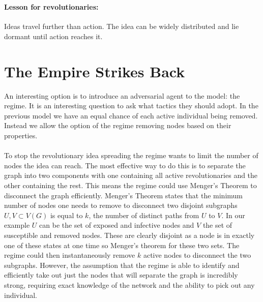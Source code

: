 \\
\begin{tcolorbox}
	\paragraph{Lesson for revolutionaries:} Ideas travel further than action. The idea can be widely distributed and lie dormant until action reaches it.
\end{tcolorbox}
\section{The Empire Strikes Back}
An interesting option is to introduce an adversarial agent to the model: the regime. It is an interesting question to ask what tactics they should adopt. In the previous model we have an equal chance of each active individual being removed. Instead we allow the option of the regime removing nodes based on their properties.\\
\\
To stop the revolutionary idea spreading the regime wants to limit the number of nodes the idea can reach. The most effective way to do this is to separate the graph into two components with one containing all active revolutionaries and the other containing the rest. This means the regime could use Menger's Theorem to disconnect the graph efficiently.
\label{mmd}
Menger's Theorem states that the minimum number of nodes one needs to remove to disconnect two disjoint subgraphs $U, V\subset V(G)$ is equal to $k$, the number of distinct paths from $U$ to $V$\cite{graph-theory-reference}. In our example $U$ can be the set of exposed and infective nodes and $V$ the set of susceptible and removed nodes. These are clearly disjoint as a node is in exactly one of these states at one time so Menger's theorem for these two sets. The regime could then instantaneously remove $k$ active nodes to disconnect the two subgraphs. 
However, the assumption that the regime is able to identify and efficiently take out just the nodes that will separate the graph is incredibly strong, requiring exact knowledge of the network and the ability to pick out any individual.\\

